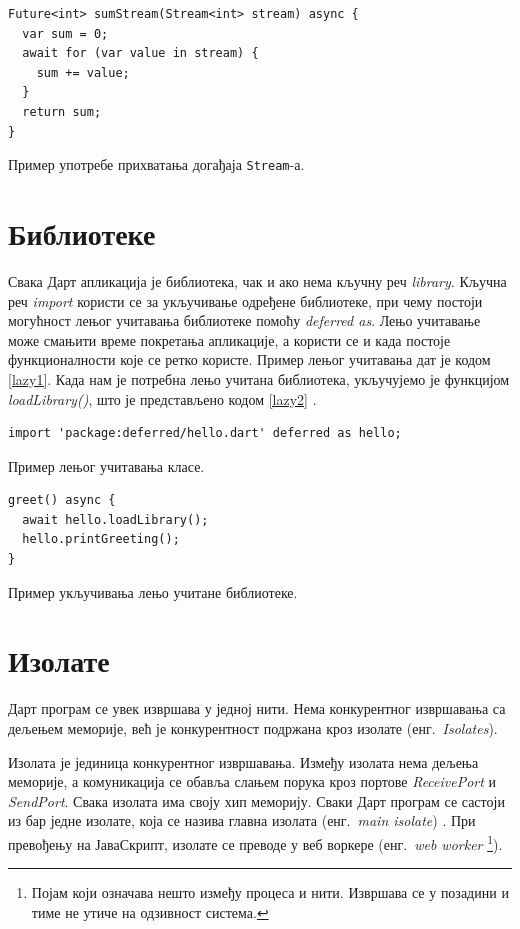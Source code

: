 \documentclass[12pt,oneside]{memoir}
\begin{document}
\begin{listing}
\begin{verbatim}
Future<int> sumStream(Stream<int> stream) async {
  var sum = 0;
  await for (var value in stream) {
    sum += value;
  }
  return sum;
}
\end{verbatim}
\caption{Пример употребе прихватања догађаја \texttt{Stream}-а.}
\label{stream}
\end{listing}

\section{Библиотеке}
\label{dart_biblioteke}
Свака Дарт апликација је библиотека, чак и ако нема кључну реч \textit{library}. Кључна реч \textit{import} користи се за укључивање одређене библиотеке, при чему постоји могућност лењог учитавања библиотеке помоћу \textit{deferred as}. Лењо учитавање може смањити време покретања апликације, а користи се и када постоје функционалности које се ретко користе. Пример лењог учитавања дат је кодом \ref{lazy1}. Када нам је потребна лењо учитана библиотека, укључујемо је функцијом \textit{loadLibrary()}, што је представљено кодом \ref{lazy2} \cite{dart, dart1}.

\begin{listing}
\begin{verbatim}
import 'package:deferred/hello.dart' deferred as hello;
\end{verbatim}
\caption{Пример лењог учитавања класе.}
\label{lazy1}
\end{listing}

\begin{listing}
\begin{verbatim}
greet() async {
  await hello.loadLibrary();
  hello.printGreeting();
}
\end{verbatim}
\caption{Пример укључивања лењо учитане библиотеке.}
\label{lazy2}
\end{listing}



\section{Изолате}
\label{dart_izolate}
Дарт програм се увек извршава у једној нити. Нема конкурентног извршавања са дељењем меморије, већ је конкурентност подржана кроз изолате (енг.~\textit{Isolates}).

Изолата је јединица конкурентног извршавања. Између изолата нема дељења меморије, а комуникација се обавља слањем порука кроз портове \textit{ReceivePort} и \textit{SendPort}. Свака изолата има своју хип меморију. Сваки Дарт програм се састоји из бар једне изолате, која се назива главна изолата (енг.~\textit{main isolate}) \cite{dart, dart1}. При превођењу на ЈаваСкрипт, изолате се преводе у веб воркере (енг.~\textit{web worker} \footnote{Појам који означава нешто између процеса и нити. Извршава се у позадини и тиме не утиче на одзивност система.}).
\end{document}
